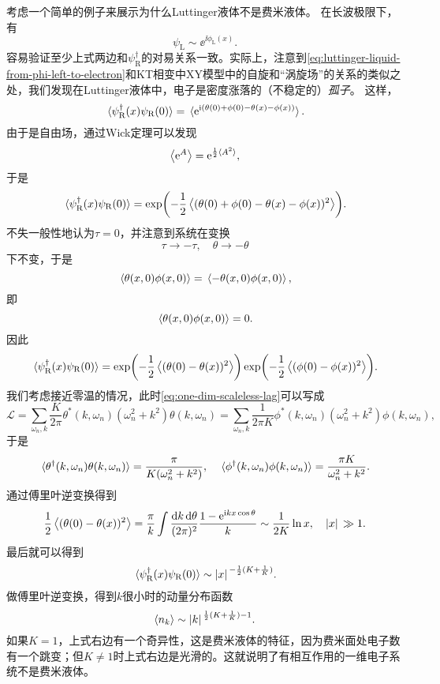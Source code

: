 考虑一个简单的例子来展示为什么Luttinger液体不是费米液体。
在长波极限下，有
\begin{equation}
    {\psi}_\text{L} \sim \ee^{\ii \phi_\text{L}(x)}.
    \label{eq:luttinger-liquid-from-phi-left-to-electron}
\end{equation}
容易验证至少上式两边和${\psi}^\dagger_\text{R}$的对易关系一致。实际上，注意到\eqref{eq:luttinger-liquid-from-phi-left-to-electron}和KT相变中XY模型中的自旋和“涡旋场”的关系的类似之处，我们发现在Luttinger液体中，电子是密度涨落的（不稳定的）\emph{孤子}。
这样，
\[
    \expval*{{\psi}_\text{R}^\dagger(x) {\psi}_\text{R}(0)} = \expval*{\mathrm{e}^{\mathrm{i} ({\theta}(0) + {\phi}(0) - {\theta}(x) - {\phi}(x))}}.
\]
由于是自由场，通过Wick定理可以发现
\[
    \expval{\mathrm{e}^{{A}}} = \mathrm{e}^{\frac{1}{2} \expval*{{A}^2}},
\]
于是
\[
    \expval*{{\psi}_\text{R}^\dagger(x) {\psi}_\text{R}(0)} = \exp(- \frac{1}{2} \expval{({\theta}(0) + {\phi}(0) - {\theta}(x) - {\phi}(x))^2}).
\]
不失一般性地认为$\tau=0$，并注意到系统在变换
\[
    \tau \longrightarrow - \tau, \quad \theta \longrightarrow -\theta
\]
下不变，于是
\[
    \expval*{{\theta}(x, 0) {\phi}(x, 0)} = \expval*{- {\theta}(x, 0) {\phi}(x, 0)},
\]
即
\[
    \expval*{{\theta}(x, 0) {\phi}(x, 0)} = 0.
\]
因此
\[
    \expval*{{\psi}_\text{R}^\dagger(x) {\psi}_\text{R}(0)} = \exp(- \frac{1}{2} \expval{({\theta}(0) - {\theta}(x))^2}) \exp(- \frac{1}{2} \expval{({\phi}(0) - {\phi}(x))^2}).
\]
我们考虑接近零温的情况，此时\eqref{eq:one-dim-scaleless-lag}可以写成
\[
    \mathcal{L} = \sum_{\omega_n, k} \frac{K}{2\pi} \theta^*(k, \omega_n) (\omega_n^2 + k^2) \theta(k, \omega_n) = \sum_{\omega_n, k} \frac{1}{2\pi K} \phi^*(k, \omega_n) (\omega_n^2 + k^2) \phi(k, \omega_n),
\]
于是
\[
    \expval*{{\theta}^\dagger(k, \omega_n) {\theta}(k, \omega_n)} = \frac{\pi}{K (\omega_n^2 + k^2)}, \quad \expval*{{\phi}^\dagger(k, \omega_n) {\phi}(k, \omega_n)} = \frac{\pi K}{\omega_n^2 + k^2}.
\]
通过傅里叶逆变换得到
\[
    \frac{1}{2} \expval{({\theta}(0) - {\theta}(x))^2} = \frac{\pi}{k} \int \frac{\dd{k} \dd{\theta}}{(2\pi)^2} \frac{1 - \mathrm{e}^{\mathrm{i} k x \cos \theta}}{k} \sim \frac{1}{2K} \ln x, \quad \abs*{x} \gg 1.
\]
最后就可以得到
\[
    \expval*{{\psi}_\text{R}^\dagger(x) {\psi}_\text{R}(0)} \sim \abs*{x}^{-\frac{1}{2}(K + \frac{1}{K})}.
\]
做傅里叶逆变换，得到$k$很小时的动量分布函数
\begin{equation}
    \expval{{n}_k} \sim \abs*{k}^{\frac{1}{2}(K + \frac{1}{K}) - 1}.
    \label{eq:one-dimensional-electron-distribution-momentum}
\end{equation}
如果$K=1$，上式右边有一个奇异性，这是费米液体的特征，因为费米面处电子数有一个跳变；但$K \neq 1$时上式右边是光滑的。这就说明了有相互作用的一维电子系统不是费米液体。

